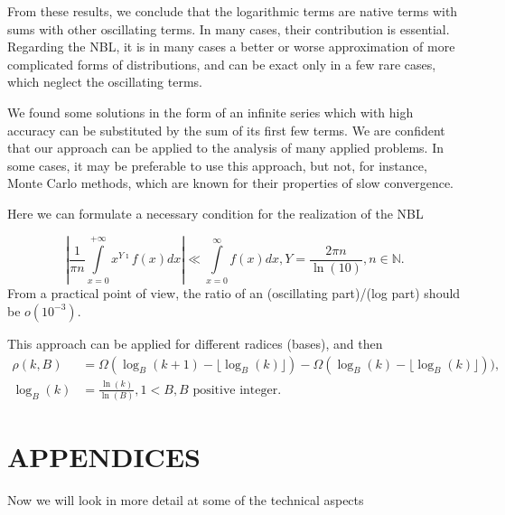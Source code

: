 \documentclass[titlepage,fleqn]{article}%
\providecommand{\U}[1]{\protect\rule{.1in}{.1in}}
\begin{document}
From these results, we conclude that the logarithmic terms are native terms
with sums with other oscillating terms. In many cases, their contribution is
essential. Regarding the NBL, it is in many cases a better or worse
approximation of more complicated forms of distributions, and can be exact
only in a few rare cases, which neglect the oscillating terms.

We found some solutions in the form of an infinite series which with high
accuracy can be substituted by the sum of its first few terms. We are
confident that our approach can be applied to the analysis of many applied
problems. In some cases, it may be preferable to use this approach, but not,
for instance, Monte Carlo methods, which are known for their properties of
slow convergence.

Here we can formulate a necessary condition for the realization of the NBL%

\begin{equation}
\left\vert \frac{1}{\pi n}%
{\displaystyle\int\limits_{x=0}^{+\infty}}
x^{Y\imath}f(x)dx\right\vert \ll%
{\displaystyle\int\limits_{x=0}^{\infty}}
f(x)dx,Y=\frac{2\pi n}{\ln(10)},n\in%
\mathbb{N}
. \label{NBLcond}%
\end{equation}
From a practical point of view, the ratio of an (oscillating part)/(log part)
should be $o(10^{-3}).$

This approach can be applied for different radices (bases), and then%
\begin{align*}
\rho(k,B)  &  =\Omega(\log_{B}(k+1)-\lfloor\log_{B}(k)\rfloor)-\Omega\left(
\log_{B}(k)-\lfloor\log_{B}(k)\rfloor\right)  ),\\
\log_{B}(k)  &  =\frac{\ln(k)}{\ln(B)},1<B,B\text{ positive integer.}%
\end{align*}
%

\section*{APPENDICES}%
%

Now we will look in more detail at some of the technical aspects%
%
\end{document}
